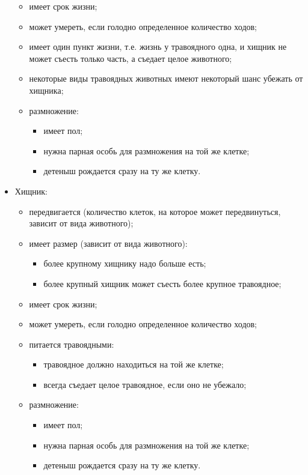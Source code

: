 \documentclass[a4paper,12pt]{article}
\begin{document}
\begin{itemize}
\begin{itemize}
  \item имеет срок жизни;
  \item может умереть, если голодно определенное количество ходов;
  \item имеет один пункт жизни, т.е. жизнь у травоядного одна, и
    хищник не может съесть только часть, а съедает целое животного;
  \item некоторые виды травоядных животных имеют некоторый шанс убежать
    от хищника;
  \item размножение:
    \begin{itemize}
    \item имеет пол;
    \item нужна парная особь для размножения на той же клетке;
    \item детеныш рождается сразу на ту же клетку.
    \end{itemize}
  \end{itemize}

\item Хищник:
  \begin{itemize}
  \item передвигается (количество клеток, на которое может
    передвинуться, зависит от вида животного);
  \item имеет размер (зависит от вида животного):
    \begin{itemize}
    \item более крупному хищнику надо больше есть;
    \item более крупный хищник может съесть более крупное травоядное;
    \end{itemize}
  \item имеет срок жизни;
  \item может умереть, если голодно определенное количество ходов;
  \item питается травоядными:
    \begin{itemize}
    \item травоядное должно находиться на той же клетке;
    \item всегда съедает целое травоядное, если оно не убежало;
    \end{itemize}
  \item размножение:
    \begin{itemize}
    \item имеет пол;
    \item нужна парная особь для размножения на той же клетке;
    \item детеныш рождается сразу на ту же клетку.
    \end{itemize}
  \end{itemize}
\end{itemize}
\end{document}
